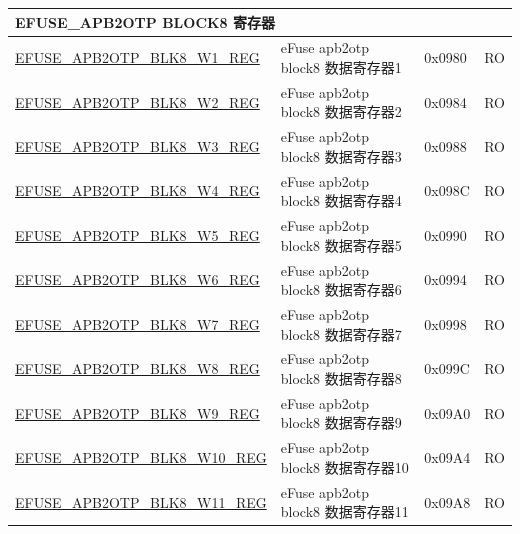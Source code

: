 \begin{longtable}{ | p{7cm} | p{6cm} | p{1.2cm} | p{1.5cm} | }
\multicolumn{4}{|l|}{\textbf{EFUSE\_APB2OTP BLOCK8 寄存器}} \\ \hline
\hyperref[regdesc:EFUSEAPB2OTPBLK8WNREG]{EFUSE\_APB2OTP\_BLK8\_W1\_REG} & eFuse apb2otp block8 数据寄存器1 & 0x0980 & RO \\\hline
\hyperref[regdesc:EFUSEAPB2OTPBLK8WNREG]{EFUSE\_APB2OTP\_BLK8\_W2\_REG} & eFuse apb2otp block8 数据寄存器2 & 0x0984 & RO \\\hline
\hyperref[regdesc:EFUSEAPB2OTPBLK8WNREG]{EFUSE\_APB2OTP\_BLK8\_W3\_REG} & eFuse apb2otp block8 数据寄存器3 & 0x0988 & RO \\\hline
\hyperref[regdesc:EFUSEAPB2OTPBLK8WNREG]{EFUSE\_APB2OTP\_BLK8\_W4\_REG} & eFuse apb2otp block8 数据寄存器4 & 0x098C & RO \\\hline
\hyperref[regdesc:EFUSEAPB2OTPBLK8WNREG]{EFUSE\_APB2OTP\_BLK8\_W5\_REG} & eFuse apb2otp block8 数据寄存器5 & 0x0990 & RO \\\hline
\hyperref[regdesc:EFUSEAPB2OTPBLK8WNREG]{EFUSE\_APB2OTP\_BLK8\_W6\_REG} & eFuse apb2otp block8 数据寄存器6 & 0x0994 & RO \\\hline
\hyperref[regdesc:EFUSEAPB2OTPBLK8WNREG]{EFUSE\_APB2OTP\_BLK8\_W7\_REG} & eFuse apb2otp block8 数据寄存器7 & 0x0998 & RO \\\hline
\hyperref[regdesc:EFUSEAPB2OTPBLK8WNREG]{EFUSE\_APB2OTP\_BLK8\_W8\_REG} & eFuse apb2otp block8 数据寄存器8 & 0x099C & RO \\\hline
\hyperref[regdesc:EFUSEAPB2OTPBLK8WNREG]{EFUSE\_APB2OTP\_BLK8\_W9\_REG} & eFuse apb2otp block8 数据寄存器9 & 0x09A0 & RO \\\hline
\hyperref[regdesc:EFUSEAPB2OTPBLK8WNREG]{EFUSE\_APB2OTP\_BLK8\_W10\_REG} & eFuse apb2otp block8 数据寄存器10 & 0x09A4 & RO \\\hline
\hyperref[regdesc:EFUSEAPB2OTPBLK8WNREG]{EFUSE\_APB2OTP\_BLK8\_W11\_REG} & eFuse apb2otp block8 数据寄存器11 & 0x09A8 & RO \\\hline



\end{longtable}
